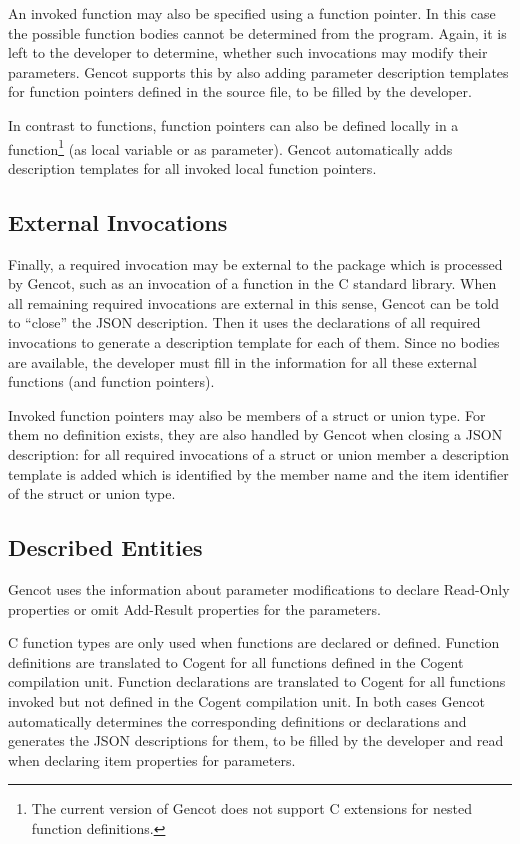 An invoked function may also be specified using a function pointer. In this case the possible function bodies cannot 
be determined from the program. Again, it is left to the developer to determine, whether such invocations may modify
their parameters. Gencot supports this by also adding parameter description templates for function pointers defined in the 
source file, to be filled by the developer. 

In contrast to functions, function pointers can also be defined locally in a function\footnote{The current version of
Gencot does not support C extensions for nested function definitions.} (as local variable or as parameter). Gencot
automatically adds description templates for all invoked local function pointers.

\subsection{External Invocations}

Finally, a required invocation may be external to the package which is processed by Gencot, such as an invocation of
a function in the C standard library. When all remaining required invocations are external in this sense, Gencot
can be told to ``close'' the JSON description. Then it uses the declarations of all required invocations to generate
a description template for each of them. Since no bodies are available, the developer must fill in the information
for all these external functions (and function pointers).

Invoked function pointers may also be members of a struct or union type. For them no definition exists, they are also 
handled by Gencot when closing a JSON description: for all required invocations of a struct or union member a 
description template is added which is identified by the member name and the item identifier of the struct or union type.
 
\subsection{Described Entities}

Gencot uses the information about parameter modifications to declare Read-Only properties or omit Add-Result properties
for the parameters. 

C function types are only used when functions are declared or defined. Function definitions are translated to
Cogent for all functions defined in the Cogent compilation unit. Function declarations are translated to Cogent
for all functions invoked but not defined in the Cogent compilation unit. In both cases Gencot automatically 
determines the corresponding definitions or declarations and generates the JSON descriptions for them, to be
filled by the developer and read when declaring item properties for parameters.

